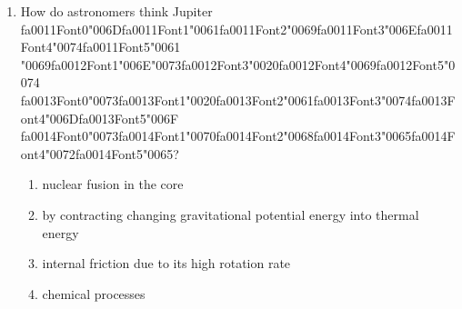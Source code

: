 \documentclass[12pt]{article}
\begin{document}
\begin{enumerate}[label=\arabic*.]
\item How do astronomers think Jupiter {\csname fa0011Font0\endcsname\char"006D}{\csname fa0011Font1\endcsname\char"0061}{\csname fa0011Font2\endcsname\char"0069}{\csname fa0011Font3\endcsname\char"006E}{\csname fa0011Font4\endcsname\char"0074}{\csname fa0011Font5\endcsname\char"0061} {\char"0069}{\csname fa0012Font1\endcsname\char"006E}{\char"0073}{\csname fa0012Font3\endcsname\char"0020}{\csname fa0012Font4\endcsname\char"0069}{\csname fa0012Font5\endcsname\char"0074} {\csname fa0013Font0\endcsname\char"0073}{\csname fa0013Font1\endcsname\char"0020}{\csname fa0013Font2\endcsname\char"0061}{\csname fa0013Font3\endcsname\char"0074}{\csname fa0013Font4\endcsname\char"006D}{\csname fa0013Font5\endcsname\char"006F} {\csname fa0014Font0\endcsname\char"0073}{\csname fa0014Font1\endcsname\char"0070}{\csname fa0014Font2\endcsname\char"0068}{\csname fa0014Font3\endcsname\char"0065}{\csname fa0014Font4\endcsname\char"0072}{\csname fa0014Font5\endcsname\char"0065}?
\begin{enumerate}[label=(\alph*)]
    \item nuclear fusion in the core
    \item by contracting changing gravitational potential energy into thermal energy
    \item internal friction due to its high rotation rate
    \item chemical processes
\end{enumerate}
\end{enumerate}
\end{document}
